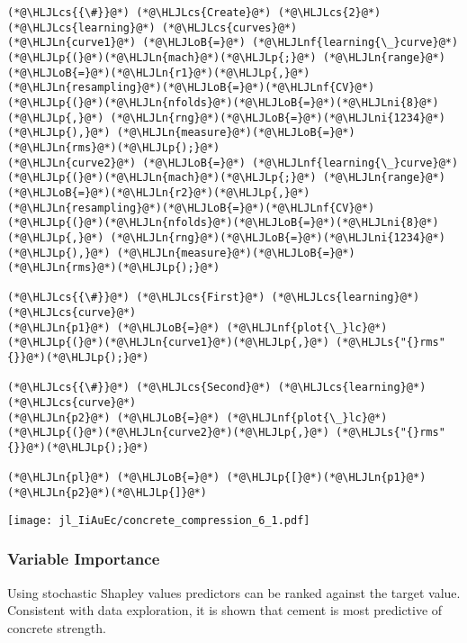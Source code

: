 \documentclass[12pt,a4paper]{article}
\newcommand{\HLJLn}[1]{#1}
\newcommand{\HLJLnf}[1]{\textcolor[RGB]{66,102,213}{#1}}
\newcommand{\HLJLs}[1]{\textcolor[RGB]{201,61,57}{#1}}
\newcommand{\HLJLni}[1]{\textcolor[RGB]{59,151,46}{#1}}
\newcommand{\HLJLoB}[1]{\textcolor[RGB]{102,102,102}{\textbf{#1}}}
\newcommand{\HLJLp}[1]{#1}
\newcommand{\HLJLcs}[1]{\textcolor[RGB]{153,153,119}{\textit{#1}}}
\begin{document}
\begin{lstlisting}
(*@\HLJLcs{{\#}}@*) (*@\HLJLcs{Create}@*) (*@\HLJLcs{2}@*) (*@\HLJLcs{learning}@*) (*@\HLJLcs{curves}@*)
(*@\HLJLn{curve1}@*) (*@\HLJLoB{=}@*) (*@\HLJLnf{learning{\_}curve}@*)(*@\HLJLp{(}@*)(*@\HLJLn{mach}@*)(*@\HLJLp{;}@*) (*@\HLJLn{range}@*)(*@\HLJLoB{=}@*)(*@\HLJLn{r1}@*)(*@\HLJLp{,}@*) (*@\HLJLn{resampling}@*)(*@\HLJLoB{=}@*)(*@\HLJLnf{CV}@*)(*@\HLJLp{(}@*)(*@\HLJLn{nfolds}@*)(*@\HLJLoB{=}@*)(*@\HLJLni{8}@*)(*@\HLJLp{,}@*) (*@\HLJLn{rng}@*)(*@\HLJLoB{=}@*)(*@\HLJLni{1234}@*)(*@\HLJLp{),}@*) (*@\HLJLn{measure}@*)(*@\HLJLoB{=}@*)(*@\HLJLn{rms}@*)(*@\HLJLp{);}@*)
(*@\HLJLn{curve2}@*) (*@\HLJLoB{=}@*) (*@\HLJLnf{learning{\_}curve}@*)(*@\HLJLp{(}@*)(*@\HLJLn{mach}@*)(*@\HLJLp{;}@*) (*@\HLJLn{range}@*)(*@\HLJLoB{=}@*)(*@\HLJLn{r2}@*)(*@\HLJLp{,}@*) (*@\HLJLn{resampling}@*)(*@\HLJLoB{=}@*)(*@\HLJLnf{CV}@*)(*@\HLJLp{(}@*)(*@\HLJLn{nfolds}@*)(*@\HLJLoB{=}@*)(*@\HLJLni{8}@*)(*@\HLJLp{,}@*) (*@\HLJLn{rng}@*)(*@\HLJLoB{=}@*)(*@\HLJLni{1234}@*)(*@\HLJLp{),}@*) (*@\HLJLn{measure}@*)(*@\HLJLoB{=}@*)(*@\HLJLn{rms}@*)(*@\HLJLp{);}@*)

(*@\HLJLcs{{\#}}@*) (*@\HLJLcs{First}@*) (*@\HLJLcs{learning}@*) (*@\HLJLcs{curve}@*)
(*@\HLJLn{p1}@*) (*@\HLJLoB{=}@*) (*@\HLJLnf{plot{\_}lc}@*)(*@\HLJLp{(}@*)(*@\HLJLn{curve1}@*)(*@\HLJLp{,}@*) (*@\HLJLs{"{}rms"{}}@*)(*@\HLJLp{);}@*)

(*@\HLJLcs{{\#}}@*) (*@\HLJLcs{Second}@*) (*@\HLJLcs{learning}@*) (*@\HLJLcs{curve}@*)
(*@\HLJLn{p2}@*) (*@\HLJLoB{=}@*) (*@\HLJLnf{plot{\_}lc}@*)(*@\HLJLp{(}@*)(*@\HLJLn{curve2}@*)(*@\HLJLp{,}@*) (*@\HLJLs{"{}rms"{}}@*)(*@\HLJLp{);}@*)

(*@\HLJLn{pl}@*) (*@\HLJLoB{=}@*) (*@\HLJLp{[}@*)(*@\HLJLn{p1}@*) (*@\HLJLn{p2}@*)(*@\HLJLp{]}@*)
\end{lstlisting}

\texttt{[image: jl\_IiAuEc/concrete\_compression\_6\_1.pdf]}

\subsubsection{Variable Importance}
Using stochastic Shapley values predictors can be ranked against the target value.  Consistent with data exploration, it is shown that cement is most predictive of concrete strength.
\end{document}
